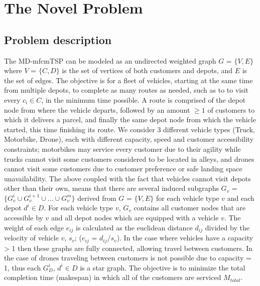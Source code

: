 \documentclass{article}
\begin{document}
	\section{The Novel Problem}
	\subsection{Problem description}
	The MD-mfcmTSP can be modeled as an undirected weighted graph $G$ = $\{V,E\}$ where $V$ = $\{C,D\}$ is the set of vertices of both customers and depots, and $E$ is the set of edges. The objective is for a fleet of vehicles, starting at the same time from multiple depots, to complete as many routes as needed, such as to to visit every $c_i\in C$, in the minimum time possible. A route is comprised of the depot node from where the vehicle departs, followed by an amount $\geq 1$ of customers to which it delivers a parcel, and finally the same depot node from which the vehicle started, this time finishing its route. We consider 3 different vehicle types (Truck, Motorbike, Drone), each with different capacity, speed and customer accessibility constraints; motorbikes may service every customer due to their agility while trucks cannot visit some customers considered to be located in alleys, and drones cannot visit some customers due to customer preference or safe landing space unavailability. The above coupled with the fact that vehicles cannot visit depots other than their own, means that there are several induced subgraphs  $G_v$ = $\{G_v^i\cup G_v^{i+1}\cup ...\cup G_v^{m}\}$ derived from $G$ = $\{V,E\}$ for each vehicle type $v$ and each depot $d^i\in D$. For each vehicle type $v$, $G_v$ contains all customer nodes that are accessible by $v$ and all depot nodes which are equipped with a vehicle $v$. The weight of each edge $e_{ij}$ is calculated as the euclidean distance $d_{ij}$ divided by the velocity of vehicle $v$, $s_v$; ($e_{ij}$ = $d_{ij}$/$s_v$). In the case where vehicles have a  capacity > 1 then these graphs are fully connected, allowing travel between customers. In the case of drones traveling between customers is not possible due to capacity = 1, thus each $G_D^i$, $d^i\in D$ is a star graph. The objective is to minimize the total completion time (makespan) in which all of the customers are serviced $M_{total}$.
	\par
\end{document}
